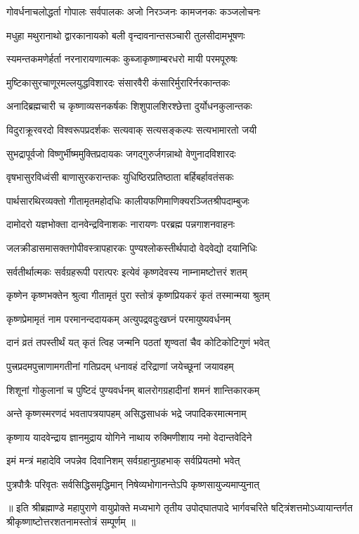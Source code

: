 \twolineshloka
{गोवर्धनाचलोद्धर्ता गोपालः सर्वपालकः}
{अजो निरञ्जनः कामजनकः कञ्जलोचनः}

\twolineshloka
{मधुहा मथुरानाथो द्वारकानायको बली}
{वृन्दावनान्तसञ्चारी तुलसीदामभूषणः}

\twolineshloka
{स्यमन्तकमणेर्हर्ता नरनारायणात्मकः}
{कुब्जाकृष्णाम्बरधरो मायी परमपूरुषः}

\twolineshloka
{मुष्टिकासुरचाणूरमल्लयुद्धविशारदः}
{संसारवैरी कंसारिर्मुरारिर्नरकान्तकः}

\twolineshloka
{अनादिब्रह्मचारी च कृष्णाव्यसनकर्षकः}
{शिशुपालशिरश्छेत्ता दुर्योधनकुलान्तकः}

\twolineshloka
{विदुराक्रूरवरदो विश्वरूपप्रदर्शकः}
{सत्यवाक् सत्यसङ्कल्पः सत्यभामारतो जयी}

\twolineshloka
{सुभद्रापूर्वजो विष्णुर्भीष्ममुक्तिप्रदायकः}
{जगद्गुरुर्जगन्नाथो वेणुनादविशारदः}

\twolineshloka
{वृषभासुरविध्वंसी बाणासुरकरान्तकः}
{युधिष्ठिरप्रतिष्ठाता बर्हिबर्हावतंसकः}

\twolineshloka
{पार्थसारथिरव्यक्तो गीतामृतमहोदधिः}
{कालीयफणिमाणिक्यरञ्जितश्रीपदाम्बुजः}

\twolineshloka
{दामोदरो यज्ञभोक्ता दानवेन्द्रविनाशकः}
{नारायणः परब्रह्म पन्नगाशनवाहनः}

\twolineshloka
{जलक्रीडासमासक्तगोपीवस्त्रापहारकः}
{पुण्यश्लोकस्तीर्थपादो वेदवेद्यो दयानिधिः}

\twolineshloka
{सर्वतीर्थात्मकः सर्वग्रहरूपी परात्परः}
{इत्येवं कृष्णदेवस्य नाम्नामष्टोत्तरं शतम्}

\twolineshloka
{कृष्णेन कृष्णभक्तेन श्रुत्वा गीतामृतं पुरा}
{स्तोत्रं कृष्णप्रियकरं कृतं तस्मान्मया श्रुतम्}

\twolineshloka
{कृष्णप्रेमामृतं नाम परमानन्ददायकम्}
{अत्युपद्रवदुःखघ्नं परमायुष्यवर्धनम्}

\twolineshloka
{दानं व्रतं तपस्तीर्थं यत् कृतं त्विह जन्मनि}
{पठतां शृण्वतां चैव कोटिकोटिगुणं भवेत्}

\twolineshloka
{पुत्त्रप्रदमपुत्त्राणामगतीनां गतिप्रदम्}
{धनावहं दरिद्राणां जयेच्छूनां जयावहम्}

\twolineshloka
{शिशूनां गोकुलानां च पुष्टिदं पुण्यवर्धनम्}
{बालरोगग्रहादीनां शमनं शान्तिकारकम्}

\twolineshloka
{अन्ते कृष्णस्मरणदं भवतापत्रयापहम्}
{असिद्धसाधकं भद्रे जपादिकरमात्मनाम्}

\twolineshloka
{कृष्णाय यादवेन्द्राय ज्ञानमुद्राय योगिने}
{नाथाय रुक्मिणीशाय नमो वेदान्तवेदिने}

\twolineshloka
{इमं मन्त्रं महादेवि जपन्नेव दिवानिशम्}
{सर्वग्रहानुग्रहभाक् सर्वप्रियतमो भवेत्}

\twolineshloka
{पुत्रपौत्रैः परिवृतः सर्वसिद्धिसमृद्धिमान्}
{निषेव्यभोगानन्तेऽपि कृष्णसायुज्यमाप्युनात्}

{॥ इति श्रीब्रह्माण्डे महापुराणे वायुप्रोक्ते मध्यभागे तृतीय उपोद्घातपादे भार्गवचरिते षट्त्रिंशत्तमोऽध्यायान्तर्गत श्रीकृष्णाष्टोत्तरशतनामस्तोत्रं सम्पूर्णम् ॥}